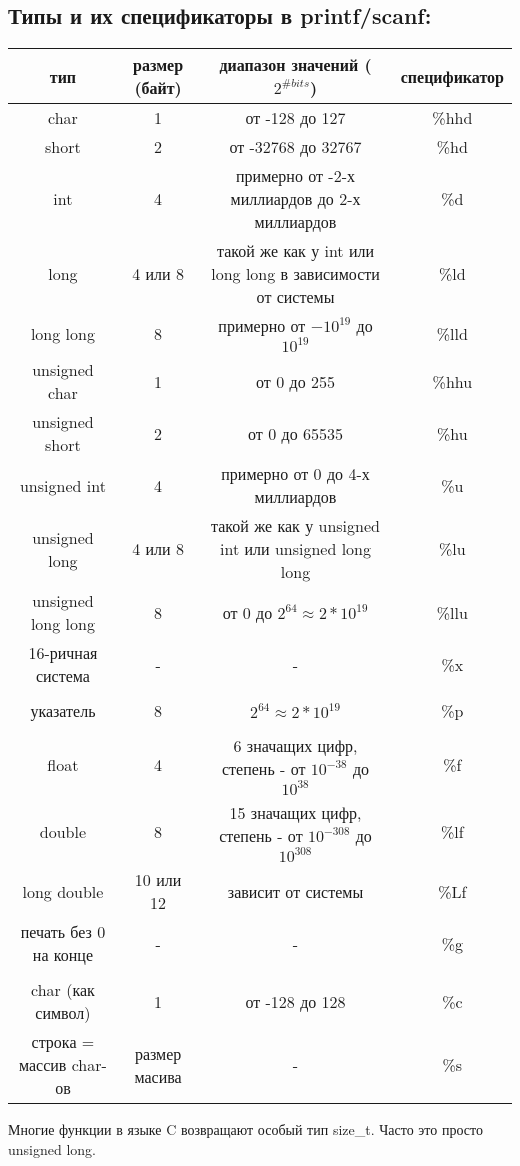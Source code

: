 \documentclass{article}
\begin{document}
\subsection*{Типы и их спецификаторы в printf/scanf:}
\begin{center}
\begin{tabular}{ c c c c }
 тип & размер (байт) & диапазон значений ($2^{\# bits}$) & спецификатор \\ \hline
 char & 1 & от -128 до 127 & \%hhd \\ 
 short & 2 & от -32768 до 32767 & \%hd  \\  
 int & 4 & примерно от -2-х миллиардов до 2-х миллиардов & \%d  \\  
 long & 4 или 8 & такой же как у int или long long в зависимости от системы & \%ld  \\  
 long long & 8 & примерно от $-10^{19}$ до $10^{19}$ & \%lld  \\  
 unsigned char & 1 & от 0 до 255 & \%hhu \\ 
 unsigned short & 2 & от 0 до 65535 & \%hu  \\  
 unsigned int & 4 & примерно от 0 до 4-х миллиардов & \%u  \\  
 unsigned long & 4 или 8 & такой же как у unsigned int или unsigned long long & \%lu  \\  
 unsigned long long & 8 & от 0 до $2^{64} \approx 2*10^{19}$  & \%llu  \\  
 16-ричная система & - & - & \%x  \\   \\
 указатель & 8 & $2^{64} \approx 2*10^{19}$ & \%p  \\   \\
 float & 4 & 6 значащих цифр, степень - от $10^{-38}$ до $10^{38}$ & \%f \\
 double & 8 & 15 значащих цифр, степень - от $10^{-308}$ до $10^{308}$ & \%lf \\
 long double & 10 или 12 & зависит от системы & \%Lf \\ 
 печать без 0 на конце & - & - & \%g \\ \\
 char (как символ) & 1 & от -128 до 128 & \%c\\
 строка = массив char-ов & размер масива & - & \%s\\ \hline
\end{tabular}
\end{center}
Многие функции в языке C возвращают особый тип size\_t. Часто это просто unsigned long.
\end{document}
